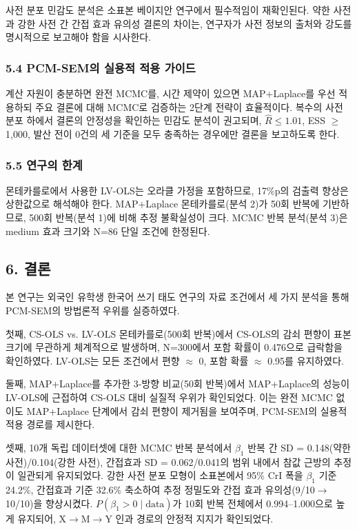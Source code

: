 \documentclass[a4paper,10pt]{oblivoir}
\begin{document}
사전 분포 민감도 분석은 소표본 베이지안 연구에서 필수적임이 재확인된다. 약한 사전과 강한 사전 간 간접 효과 유의성 결론의 차이는, 연구자가 사전 정보의 출처와 강도를 명시적으로 보고해야 함을 시사한다.

\subsubsection{5.4 PCM-SEM의 실용적 적용 가이드}

계산 자원이 충분하면 완전 MCMC를, 시간 제약이 있으면 MAP+Laplace를 우선 적용하되 주요 결론에 대해 MCMC로 검증하는 2단계 전략이 효율적이다. 복수의 사전 분포 하에서 결론의 안정성을 확인하는 민감도 분석이 권고되며, $\hat{R} \leq 1.01$, ESS \ensuremath{\geq} 1,000, 발산 전이 0건의 세 기준을 모두 충족하는 경우에만 결론을 보고하도록 한다.

\subsubsection{5.5 연구의 한계}

몬테카를로에서 사용한 LV-OLS는 오라클 가정을 포함하므로, 17\%p의 검출력 향상은 상한값으로 해석해야 한다. MAP+Laplace 몬테카를로(분석 2)가 50회 반복에 기반하므로, 500회 반복(분석 1)에 비해 추정 불확실성이 크다. MCMC 반복 분석(분석 3)은 medium 효과 크기와 N=86 단일 조건에 한정된다.


\subsection{6. 결론}

본 연구는 외국인 유학생 한국어 쓰기 태도 연구의 자료 조건에서 세 가지 분석을 통해 PCM-SEM의 방법론적 우위를 실증하였다.

첫째, CS-OLS vs. LV-OLS 몬테카를로(500회 반복)에서 CS-OLS의 감쇠 편향이 표본 크기에 무관하게 체계적으로 발생하며, N=300에서 포함 확률이 0.476으로 급락함을 확인하였다. LV-OLS는 모든 조건에서 편향 \ensuremath{\approx} 0, 포함 확률 \ensuremath{\approx} 0.95를 유지하였다.

둘째, MAP+Laplace를 추가한 3-방향 비교(50회 반복)에서 MAP+Laplace의 성능이 LV-OLS에 근접하여 CS-OLS 대비 실질적 우위가 확인되었다. 이는 완전 MCMC 없이도 MAP+Laplace 단계에서 감쇠 편향이 제거됨을 보여주며, PCM-SEM의 실용적 적용 경로를 제시한다.

셋째, 10개 독립 데이터셋에 대한 MCMC 반복 분석에서 $\beta_1$ 반복 간 SD = 0.148(약한 사전)/0.104(강한 사전), 간접효과 SD = 0.062/0.041의 범위 내에서 참값 근방의 추정이 일관되게 유지되었다. 강한 사전 분포 모형이 소표본에서 95\% CrI 폭을 $\beta_1$ 기준 24.2\%, 간접효과 기준 32.6\% 축소하여 추정 정밀도와 간접 효과 유의성(9/10\ensuremath{\rightarrow}10/10)을 향상시켰다. $P(\beta_1 > 0 \mid \text{data})$가 10회 반복 전체에서 0.994--1.000으로 높게 유지되어, X\ensuremath{\rightarrow}M\ensuremath{\rightarrow}Y 인과 경로의 안정적 지지가 확인되었다.
\end{document}

